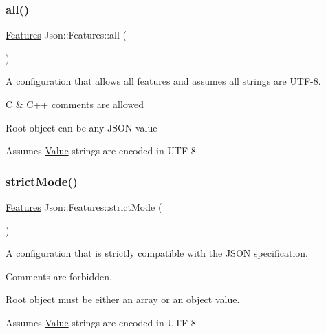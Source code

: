 \subsubsection{\texorpdfstring{all()}{all()}}
{\footnotesize\ttfamily \hyperlink{classJson_1_1Features}{Features} Json\+::\+Features\+::all (\begin{DoxyParamCaption}{ }\end{DoxyParamCaption})\hspace{0.3cm}{\ttfamily [static]}}



A configuration that allows all features and assumes all strings are U\+T\+F-\/8. 


\begin{DoxyItemize}
\item C \& C++ comments are allowed
\item Root object can be any J\+S\+ON value
\item Assumes \hyperlink{classJson_1_1Value}{Value} strings are encoded in U\+T\+F-\/8 
\end{DoxyItemize}\mbox{\label{classJson_1_1Features_ae23176c14b2e79e81fb61fb1a8ab58ee}} 
\subsubsection{\texorpdfstring{strict\+Mode()}{strictMode()}}
{\footnotesize\ttfamily \hyperlink{classJson_1_1Features}{Features} Json\+::\+Features\+::strict\+Mode (\begin{DoxyParamCaption}{ }\end{DoxyParamCaption})\hspace{0.3cm}{\ttfamily [static]}}



A configuration that is strictly compatible with the J\+S\+ON specification. 


\begin{DoxyItemize}
\item Comments are forbidden.
\item Root object must be either an array or an object value.
\item Assumes \hyperlink{classJson_1_1Value}{Value} strings are encoded in U\+T\+F-\/8 
\end{DoxyItemize}

